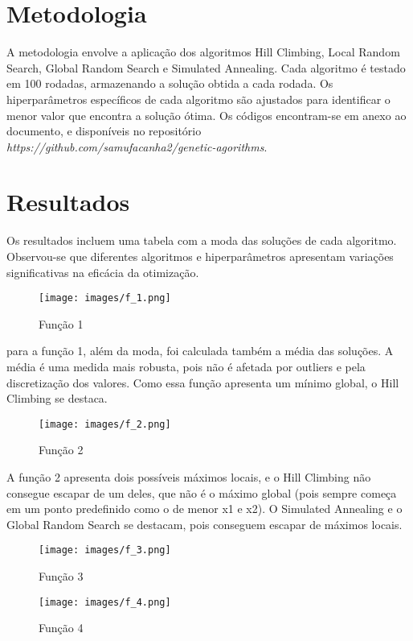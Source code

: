 \documentclass[conference]{IEEEtran}
\begin{document}
\section{Metodologia}
A metodologia envolve a aplicação dos algoritmos Hill Climbing, Local Random Search, Global Random Search e Simulated Annealing. Cada algoritmo é testado em 100 rodadas, armazenando a solução obtida a cada rodada. Os hiperparâmetros específicos de cada algoritmo são ajustados para identificar o menor valor que encontra a solução ótima. Os códigos encontram-se em anexo ao documento, e disponíveis no repositório \textit{https://github.com/samufacanha2/genetic-agorithms}.

\section{Resultados}
Os resultados incluem uma tabela com a moda das soluções de cada algoritmo. Observou-se que diferentes algoritmos e hiperparâmetros apresentam variações significativas na eficácia da otimização.

\begin{figure}
    \centering
    \texttt{[image: images/f\_1.png]}
    \caption{Função 1}
    \label{fig:my_label}
\end{figure}

para a função 1, além da moda, foi calculada também a média das soluções. A média é uma medida mais robusta, pois não é afetada por outliers e pela discretização dos valores. Como essa função apresenta um mínimo global, o Hill Climbing se destaca.

\begin{figure}
    \centering
    \texttt{[image: images/f\_2.png]}
    \caption{Função 2}
    \label{fig:my_label}
\end{figure}

A função 2 apresenta dois possíveis máximos locais, e o Hill Climbing não consegue escapar de um deles, que não é o máximo global (pois sempre começa em um ponto predefinido como o de menor x1 e x2). O Simulated Annealing e o Global Random Search se destacam, pois conseguem escapar de máximos locais.

\begin{figure}
    \centering
    \texttt{[image: images/f\_3.png]}
    \caption{Função 3}
    \label{fig:my_label}
\end{figure}

\begin{figure}
    \centering
    \texttt{[image: images/f\_4.png]}
    \caption{Função 4}
    \label{fig:my_label}
\end{figure}
\end{document}
